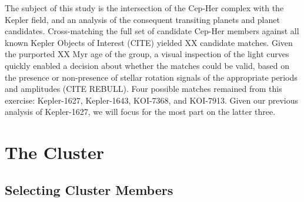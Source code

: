 \documentclass[12pt,twocolumn,linenumbers]{aastex63}
\begin{document}
The subject of this study is the intersection of the Cep-Her complex
with the Kepler field, and an analysis of the consequent transiting
planets and planet candidates.  Cross-matching the full set of
candidate Cep-Her members against all known Kepler Objects of Interest
(CITE) yielded XX candidate matches.  Given the purported XX Myr age
of the group, a visual inspection of the light curves quickly enabled
a decision about whether the matches could be valid, based on the
presence or non-presence of stellar rotation signals of the
appropriate periods and amplitudes (CITE REBULL).  Four possible
matches remained from this exercise: Kepler-1627, Kepler-1643,
KOI-7368, and KOI-7913.  Given our previous analysis of Kepler-1627,
we will focus for the most part on the latter three.


\section{The Cluster}
\label{sec:cluster}

\subsection{Selecting Cluster Members}
\label{sec:kinematicselection}
\end{document}
